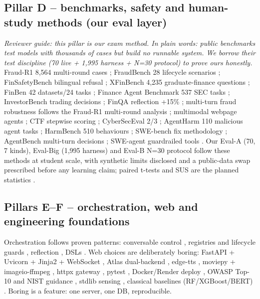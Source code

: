 \documentclass[11pt,a4paper]{article}
\begin{document}
\subsection{Pillar D -- benchmarks, safety and human-study methods (our eval layer)}
\noindent\textit{Reviewer guide: this pillar is our exam method. In plain words: public benchmarks test models with thousands of cases but build no runnable system. We borrow their test discipline (70 live + 1,995 harness + N=30 protocol) to prove ours honestly.}
Fraud-R1 8,564 multi-round cases \cite{FraudR125}; FraudBench 28 lifecycle scenarios \cite{FraudBench25}; FinSafetyBench bilingual refusal \cite{FinSafety26}; XFinBench 4,235 graduate-finance questions \cite{XFin25}; FinBen 42 datasets/24 tasks \cite{FinBen24}; Finance Agent Benchmark 537 SEC tasks \cite{FinAgentBench25}; InvestorBench trading decisions \cite{Investor25}; FinQA reflection +15\% \cite{FinQA24}; multi-turn fraud robustness follows the Fraud-R1 multi-round analysis \cite{FraudR125}; multimodal webpage agents \cite{PhishAgent25}; CTF stepwise scoring \cite{Cybench25}; CyberSecEval 2/3 \cite{SecEval225,SecEval325}; AgentHarm 110 malicious agent tasks \cite{AgentHarm25}; HarmBench 510 behaviours \cite{HarmBench24}; SWE-bench fix methodology \cite{SWEbench24}; AgentBench multi-turn decisions \cite{AgentBench24}; SWE-agent guardrailed tools \cite{SWEagent24}. Our Eval-A (70, 7 kinds), Eval-Big (1,995 harness) and Eval-B N=30 protocol follow these methods at student scale, with synthetic limits disclosed and a public-data swap prescribed before any learning claim; paired t-tests and SUS are the planned statistics \cite{EvalMethod24}.

\subsection{Pillars E--F -- orchestration, web and engineering foundations}
Orchestration follows proven patterns: conversable control \cite{AutoGen24}, registries and lifecycle guards \cite{SAGA25}, reflection \cite{Aegis25}, DSLs \cite{AIR26}. Web choices are deliberately boring: FastAPI + Uvicorn + Jinja2 + WebSocket \cite{FastAPI24,Jinja24,RFC6455}, Atlas dual-backend \cite{Mongo24}, edge-tts \cite{EdgeTTS24}, moviepy + imageio-ffmpeg \cite{Moviepy24}, httpx gateway \cite{HTTPX24}, pytest \cite{Pytest24}, Docker/Render deploy \cite{Docker24}, OWASP Top-10 and NIST guidance \cite{OWASP24,NIST24,OWASPASVS24,NISTCSF24}, stdlib sensing \cite{PyStd24}, classical baselines (RF/XGBoost/BERT) \cite{Algo25,FinFraud25,BERT24}. Boring is a feature: one server, one DB, reproducible.
\end{document}
